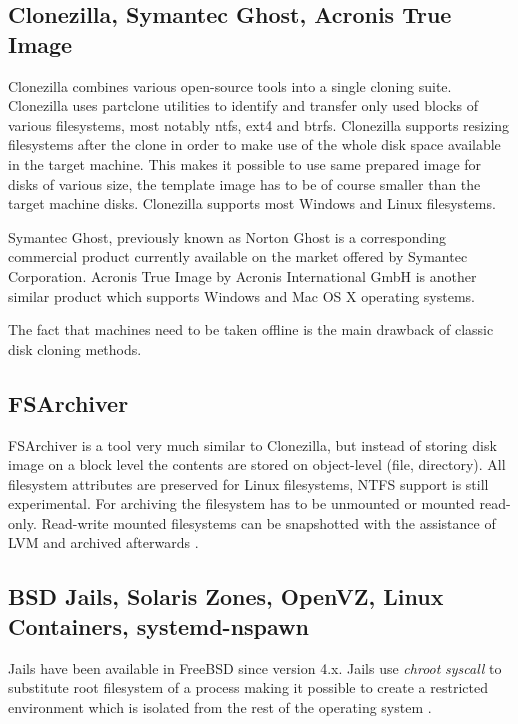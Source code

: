\documentclass[a4paper,11pt]{kth-mag}
\begin{document}
\subsection{Clonezilla, Symantec Ghost, Acronis True Image}

Clonezilla \cite{clonezilla}
combines various open-source tools into a single cloning suite.
Clonezilla uses partclone utilities \cite{partclone} to
identify and transfer only used blocks of various filesystems, most notably
\acrshort{ntfs}, \acrshort{ext4} and \acrshort{btrfs}.
Clonezilla supports resizing filesystems after the clone
in order to make use of the whole disk space available
in the target machine.
This makes it possible to use same prepared image for disks of
various size, the template image has to be of course smaller
than the target machine disks.
Clonezilla supports most Windows and Linux filesystems.

Symantec Ghost, previously known as Norton Ghost is a corresponding commercial
product currently available on the market
\cite{symantec-ghost}
offered by Symantec Corporation.
Acronis True Image
\cite{acronis-true-image}
by Acronis International GmbH
is another similar product which supports Windows
and Mac OS X operating systems.

The fact that machines need to be taken offline is the main
drawback of classic disk cloning methods.

\subsection{FSArchiver}

FSArchiver
is a tool very much similar to Clonezilla,
but instead of storing disk image on a block level the
contents are stored on object-level (file, directory).
All filesystem attributes are preserved for Linux filesystems,
NTFS support is still experimental.
For archiving the filesystem has to be unmounted or mounted
read-only. Read-write mounted filesystems can be snapshotted 
with the assistance of LVM and archived afterwards
\cite{fsarchiver}.


\subsection{BSD Jails, Solaris Zones, OpenVZ, Linux Containers, systemd-nspawn}

Jails have been available in FreeBSD since version 4.x. Jails use
\emph{chroot} \emph{syscall} to substitute root filesystem of a
process making it possible to create a restricted environment which
is isolated from the rest of the operating system \cite{jail}.
\end{document}
